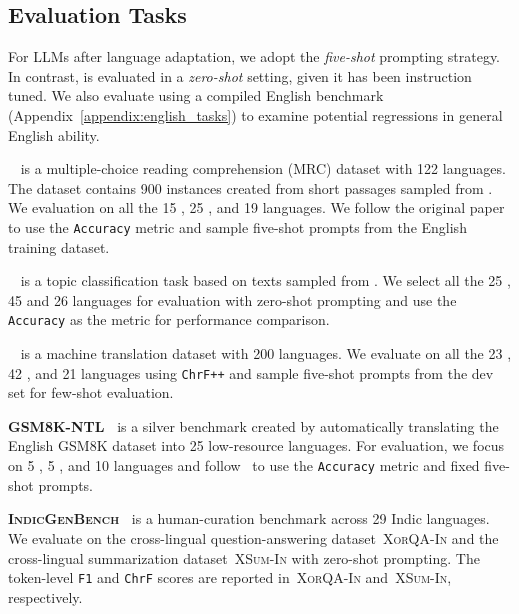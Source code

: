 \subsection{Evaluation Tasks}
For LLMs after language adaptation, we adopt the \emph{five-shot} prompting strategy. In contrast, \ouradapter is evaluated in a \emph{zero-shot} setting, given it has been instruction tuned. We also evaluate \ouradapter using a compiled English benchmark (Appendix~\ref{appendix:english_tasks}) to examine potential regressions in general English ability.

\textbf{\belebele~\citep{bandarkar-etal-2024-belebele}}
is a multiple-choice reading comprehension (MRC) dataset 
with 122 languages.
The dataset contains 900 instances created from short passages sampled from \flores. 
We evaluation on all the 15 \sea, 25 \afr, and 19 \ind languages. 
We follow the original paper to use the \texttt{Accuracy} metric and sample five-shot prompts from the English training dataset. 

\textbf{\sib~\citep{adelani-etal-2024-sib}}
is a topic classification task based on texts sampled from \flores. 
We select all the 25 \sea, 45 \afr and 26 \ind languages for evaluation with zero-shot prompting and use the \texttt{Accuracy} as the metric for performance comparison.

\textbf{\flores~\citep{goyal-etal-2022-flores}}
is a machine translation dataset with 200 languages. 
We evaluate on all the 23 \sea, 42 \afr, and 21 \ind languages using \texttt{ChrF++} and sample five-shot prompts from the dev set for few-shot evaluation.

\textbf{GSM8K-NTL~\citep{shi2023language, bansal2024llm}}
is a silver benchmark created by automatically translating the English GSM8K dataset into 25 low-resource languages. For evaluation, we focus on 5 \sea, 5 \afr, and 10 \ind languages and follow~\citet{bansal2024llm} to use the \texttt{Accuracy} metric and fixed five-shot prompts.

\textbf{\textsc{IndicGenBench}~\citep{singh-etal-2024-indicgenbench}}
is a human-curation benchmark across 29 Indic languages. We evaluate on the cross-lingual question-answering dataset~\textsc{XorQA-In} and the cross-lingual summarization dataset~\textsc{XSum-In} with zero-shot prompting. The token-level \texttt{F1} and \texttt{ChrF} scores are reported in~\textsc{XorQA-In} and~\textsc{XSum-In}, respectively.

